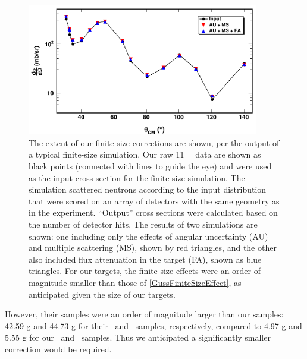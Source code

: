 \begin{figure}[tb]
    \centering
    \includegraphics[width=0.9\textwidth]{figures/finiteSizeCorrections.png}
    \caption[Effect of finite-size corrections on our neutron \el\ measurement]
    {
        The extent of our finite-size corrections are shown, per the output
        of a typical finite-size simulation. Our raw 11 \mega\electronvolt\ \snFour \el\ data
        are shown as black points (connected with lines to guide the eye) and
        were used as the input cross section for the finite-size simulation.
        The simulation scattered neutrons according to the input distribution
        that were scored on an array of detectors with the same geometry
        as in the experiment. ``Output'' cross sections were calculated based on
        the number of detector hits. The results of two simulations are shown:
        one including only the effects of
        angular uncertainty (AU) and multiple scattering (MS), shown by red
        triangles, and the other also included flux attenuation in the target
        (FA), shown as blue triangles. For our targets, the finite-size effects
        were an order of magnitude smaller than those of
        \ref{GussFiniteSizeEffect}, as anticipated given the size of our targets.
    }
    \label{finiteSizeCorrections}
\end{figure}
However, their samples
were an order of magnitude larger than our
samples: 42.59 g and 44.73 g for their \snSixteen\ and \snTwenty\ samples,
respectively, compared to 4.97 g and 5.55 g for our \snTwelve\ and \snFour\
samples. Thus we anticipated a significantly smaller correction would be
required.

